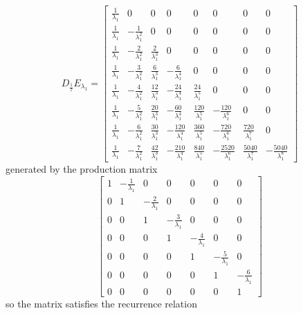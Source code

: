 \iffalse %
\begin{displaymath}
D_{\frac{1}{z}}E_{\lambda_{1}} = \left[\begin{matrix}\frac{1}{\lambda_{1}} & 0 & 0 & 0 & 0 & 0 & 0 & 0\\\frac{1}{\lambda_{1}} & - \frac{1}{\lambda_{1}^{2}} & 0 & 0 & 0 & 0 & 0 & 0\\\frac{1}{\lambda_{1}} & - \frac{2}{\lambda_{1}^{2}} & \frac{2}{\lambda_{1}^{3}} & 0 & 0 & 0 & 0 & 0\\\frac{1}{\lambda_{1}} & - \frac{3}{\lambda_{1}^{2}} & \frac{6}{\lambda_{1}^{3}} & - \frac{6}{\lambda_{1}^{4}} & 0 & 0 & 0 & 0\\\frac{1}{\lambda_{1}} & - \frac{4}{\lambda_{1}^{2}} & \frac{12}{\lambda_{1}^{3}} & - \frac{24}{\lambda_{1}^{4}} & \frac{24}{\lambda_{1}^{5}} & 0 & 0 & 0\\\frac{1}{\lambda_{1}} & - \frac{5}{\lambda_{1}^{2}} & \frac{20}{\lambda_{1}^{3}} & - \frac{60}{\lambda_{1}^{4}} & \frac{120}{\lambda_{1}^{5}} & - \frac{120}{\lambda_{1}^{6}} & 0 & 0\\\frac{1}{\lambda_{1}} & - \frac{6}{\lambda_{1}^{2}} & \frac{30}{\lambda_{1}^{3}} & - \frac{120}{\lambda_{1}^{4}} & \frac{360}{\lambda_{1}^{5}} & - \frac{720}{\lambda_{1}^{6}} & \frac{720}{\lambda_{1}^{7}} & 0\\\frac{1}{\lambda_{1}} & - \frac{7}{\lambda_{1}^{2}} & \frac{42}{\lambda_{1}^{3}} & - \frac{210}{\lambda_{1}^{4}} & \frac{840}{\lambda_{1}^{5}} & - \frac{2520}{\lambda_{1}^{6}} & \frac{5040}{\lambda_{1}^{7}} & - \frac{5040}{\lambda_{1}^{8}}\end{matrix}\right]
\end{displaymath}
generated by the production matrix
\begin{displaymath}
\left[\begin{matrix}1 & - \frac{1}{\lambda_{1}} & 0 & 0 & 0 & 0 & 0\\0 & 1 & - \frac{2}{\lambda_{1}} & 0 & 0 & 0 & 0\\0 & 0 & 1 & - \frac{3}{\lambda_{1}} & 0 & 0 & 0\\0 & 0 & 0 & 1 & - \frac{4}{\lambda_{1}} & 0 & 0\\0 & 0 & 0 & 0 & 1 & - \frac{5}{\lambda_{1}} & 0\\0 & 0 & 0 & 0 & 0 & 1 & - \frac{6}{\lambda_{1}}\\0 & 0 & 0 & 0 & 0 & 0 & 1\end{matrix}\right]
\end{displaymath}
so the matrix satisfies the recurrence relation 
